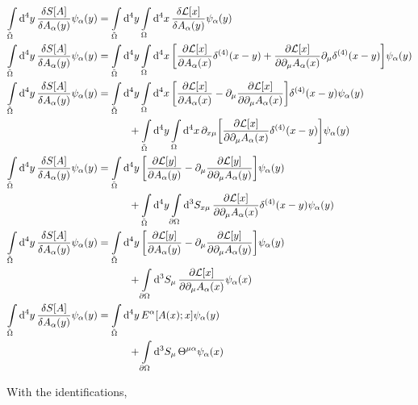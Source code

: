 \begin{align}
    \int\limits_{\tilde\Omega}\dd[4]{y}\fdv{S[A]}{A_\alpha\qty(y)}\psi_\alpha\qty(y)&=\int\limits_{\tilde\Omega}\dd[4]{y}\int\limits_\Omega\dd[4]{x}\fdv{\mathcal L[x]}{A_\alpha\qty(y)}\psi_\alpha(y)\\
    \int\limits_{\tilde\Omega}\dd[4]{y}\fdv{S[A]}{A_\alpha\qty(y)}\psi_\alpha\qty(y)&=\int\limits_{\tilde\Omega}\dd[4]{y}\int\limits_\Omega\dd[4]{x}\qty[\pdv{\mathcal L[x]}{A_\alpha\qty(x)}\delta^{(4)}\qty(x-y)+\pdv{\mathcal L[x]}{\partial_\mu A_\alpha\qty(x)}\partial_\mu\delta^{(4)}\qty(x-y)]\psi_\alpha(y)\\
    \int\limits_{\tilde\Omega}\dd[4]{y}\fdv{S[A]}{A_\alpha\qty(y)}\psi_\alpha\qty(y)&=\int\limits_{\tilde\Omega}\dd[4]{y}\int\limits_\Omega\dd[4]{x}\qty[\pdv{\mathcal L[x]}{A_\alpha\qty(x)}-\partial_\mu\pdv{\mathcal L[x]}{\partial_\mu A_\alpha\qty(x)}]\delta^{(4)}\qty(x-y)\psi_\alpha(y)\nonumber\\
    &\quad\quad\quad+\int\limits_{\tilde\Omega}\dd[4]{y}\int\limits_\Omega\dd[4]{x}\partial_{x\mu}\qty[\pdv{\mathcal L[x]}{\partial_\mu A_\alpha\qty(x)}\delta^{(4)}\qty(x-y)]\psi_\alpha(y)\\
    \int\limits_{\tilde\Omega}\dd[4]{y}\fdv{S[A]}{A_\alpha\qty(y)}\psi_\alpha\qty(y)&=\int\limits_{\tilde\Omega}\dd[4]{y}\qty[\pdv{\mathcal L[y]}{A_\alpha\qty(y)}-\partial_\mu\pdv{\mathcal L[y]}{\partial_\mu A_\alpha\qty(y)}]\psi_\alpha(y)\nonumber\\
    &\quad\quad\quad+\int\limits_{\tilde\Omega}\dd[4]{y}\int\limits_{\partial\Omega}\dd[3]{S_{x\mu}}\pdv{\mathcal L[x]}{\partial_\mu A_\alpha\qty(x)}\delta^{(4)}\qty(x-y)\psi_\alpha(y)\\
    \int\limits_{\tilde\Omega}\dd[4]{y}\fdv{S[A]}{A_\alpha\qty(y)}\psi_\alpha\qty(y)&=\int\limits_{\tilde\Omega}\dd[4]{y}\qty[\pdv{\mathcal L[y]}{A_\alpha\qty(y)}-\partial_\mu\pdv{\mathcal L[y]}{\partial_\mu A_\alpha\qty(y)}]\psi_\alpha(y)\nonumber\\
    &\quad\quad\quad+\int\limits_{\partial\Omega}\dd[3]{S_{\mu}}\pdv{\mathcal L[x]}{\partial_\mu A_\alpha\qty(x)}\psi_\alpha(x)\\
    \int\limits_{\tilde\Omega}\dd[4]{y}\fdv{S[A]}{A_\alpha\qty(y)}\psi_\alpha\qty(y)&=\int\limits_{\tilde\Omega}\dd[4]{y}E^\alpha\qty[A(x);x]\psi_\alpha(y)\nonumber\\
    &\quad\quad\quad+\int\limits_{\partial\Omega}\dd[3]{S_{\mu}}\Theta^{\mu\alpha}\psi_\alpha(x)
\end{align}

With the identifications,

